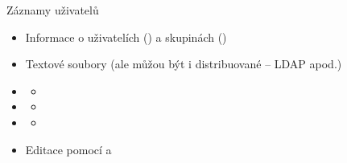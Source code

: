 \begin{frame}{Záznamy uživatelů}

  \begin{itemize}
    \item Informace o uživatelích () a skupinách ()

    \pause

    \item Textové soubory (ale můžou být i distribuované -- LDAP apod.)

    \pause

    \item {}
    \begin{itemize}
      \item {}
    \end{itemize}

    \item {}
    \begin{itemize}
      \item {}
    \end{itemize}

    \pause

    \item {}
    \begin{itemize}
      \item {}
    \end{itemize}

    \pause

    \item Editace pomocí  a 
  \end{itemize}

\end{frame}


